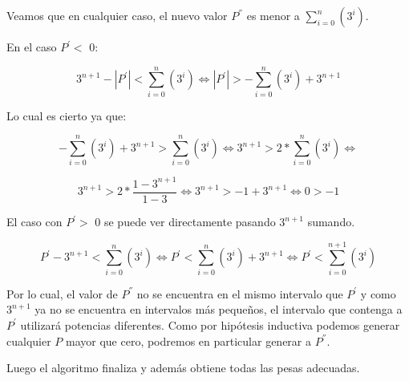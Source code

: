 Veamos que en cualquier caso, el nuevo valor $P^{''}$ es menor a $\sum_{i=0}^{n}(3^i)$.

En el caso $P^{'} <$ 0:

\begin{equation}
3^{n+1} - |P^{'}| < \sum_{i=0}^{n}(3^i) \iff
|P^{'}| > - \sum_{i=0}^{n}(3^i) + 3^{n+1}
\end{equation}

Lo cual es cierto ya que:

\begin{equation}
- \sum_{i=0}^{n}(3^i) + 3^{n+1} >  \sum_{i=0}^{n}(3^i) \iff
3^{n+1} > 2 \ast \sum_{i=0}^{n}(3^i) \iff
\end{equation}

\begin{equation}
3^{n+1} > 2 \ast \frac{1-3^{n+1}}{1-3} \iff
3^{n+1} > -1+3^{n+1} \iff
0 > -1
\end{equation}

El caso con $P^{'} >$ 0 se puede ver directamente pasando $3^{n+1}$ sumando.

\begin{equation}
P^{'} - 3^{n+1} < \sum_{i=0}^{n}(3^i) \iff
P^{'} < \sum_{i=0}^{n}(3^i) + 3^{n+1} \iff
P^{'} < \sum_{i=0}^{n+1}(3^i)
\end{equation}

Por lo cual, el valor de $P^{''}$ no se encuentra en el mismo intervalo que $P^{'}$ y como $3^{n+1}$ ya no se encuentra en intervalos más pequeños, el intervalo que contenga a $P^{'}$ utilizará potencias diferentes. Como por hipótesis inductiva podemos generar cualquier $P$ mayor que cero, podremos en particular generar a $P^{''}$.

Luego el algoritmo finaliza y además obtiene todas las pesas adecuadas.\\
